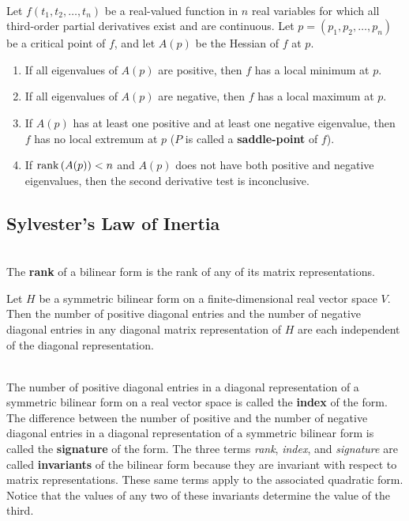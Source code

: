\begin{theorem}
	\hfill\\
	Let $f(t_1, t_2, \dots, t_n)$ be a real-valued function in $n$ real variables for which all third-order partial derivatives exist and are continuous. Let $p = (p_1, p_2, \dots, p_n)$ be a critical point of $f$, and let $A(p)$ be the Hessian of $f$ at $p$.

	\begin{enumerate}
		\item If all eigenvalues of $A(p)$ are positive, then $f$ has a local minimum at $p$.
		\item If all eigenvalues of $A(p)$ are negative, then $f$ has a local maximum at $p$.
		\item If $A(p)$ has at least one positive and at least one negative eigenvalue, then $f$ has no local extremum at $p$ ($P$ is called a \textbf{saddle-point} of $f$).
		\item If $\text{rank}\left(A(p)\right) < n$ and $A(p)$ does not have both positive and negative eigenvalues, then the second derivative test is inconclusive.
	\end{enumerate}
\end{theorem}

\subsection*{Sylvester's Law of Inertia}

\begin{definition}
	\hfill\\
	The \textbf{rank} of a bilinear form is the rank of any of its matrix representations.
\end{definition}

\begin{theorem}
	Let $H$ be a symmetric bilinear form on a finite-dimensional real vector space $V$. Then the number of positive diagonal entries and the number of negative diagonal entries in any diagonal matrix representation of $H$ are each independent of the diagonal representation.
\end{theorem}

\begin{definition}
	\hfill\\
	The number of positive diagonal entries in a diagonal representation of a symmetric bilinear form on a real vector space is called the \textbf{index} of the form. The difference between the number of positive and the number of negative diagonal entries in a diagonal representation of a symmetric bilinear form is called the \textbf{signature} of the form. The three terms \textit{rank}, \textit{index}, and \textit{signature} are called \textbf{invariants} of the bilinear form because they are invariant with respect to matrix representations. These same terms apply to the associated quadratic form. Notice that the values of any two of these invariants determine the value of the third.
\end{definition}

